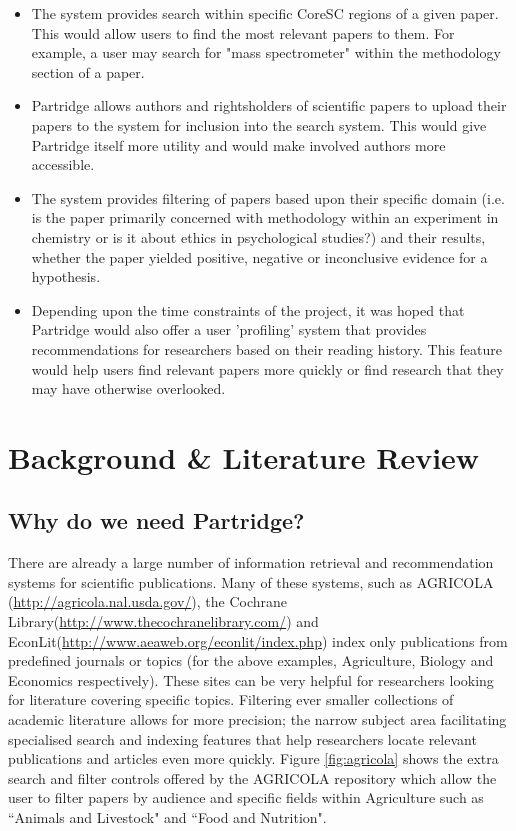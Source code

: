 \begin{itemize}
\item The system provides search within specific CoreSC regions of a given
paper. This would allow users to find the most relevant papers to them. For
example, a user may search for "mass spectrometer" within the methodology
section of a paper.
\item Partridge allows authors and rightsholders of scientific papers to
upload their papers to the system for inclusion into the search system. This
would give Partridge itself more utility and would make involved authors more
accessible.
\item The system provides filtering of papers based upon their
specific domain (i.e. is the paper primarily concerned with methodology within
an experiment in chemistry or is it about ethics in psychological studies?) and
their results, whether the paper yielded positive, negative or inconclusive
evidence for a hypothesis. 
\item Depending upon the time constraints of the
project, it was hoped that Partridge would also offer a user 'profiling' system
that provides recommendations for researchers based on their reading history.
This feature would help users find relevant papers more quickly or find
research that they may have otherwise overlooked.
\end{itemize}

\section{Background \& Literature Review}

\subsection{ Why do we need Partridge? }

There are already a large number of information retrieval and recommendation
systems for scientific publications.  Many of these systems, such as AGRICOLA
(\url{http://agricola.nal.usda.gov/}), the Cochrane
Library(\url{http://www.thecochranelibrary.com/}) and
EconLit(\url{http://www.aeaweb.org/econlit/index.php}) index only publications
from predefined journals or topics (for the above examples, Agriculture,
Biology and Economics respectively). These sites can be very helpful for
researchers looking for literature covering specific topics. Filtering ever
smaller collections of academic literature allows for more precision; the
narrow subject area facilitating specialised search and indexing features that
help researchers locate relevant publications and articles even more quickly.
Figure \ref{fig:agricola} shows the extra search and filter controls offered by
the AGRICOLA repository which allow the user to filter papers by audience and
specific fields within Agriculture such as ``Animals and Livestock" and ``Food
and Nutrition".

